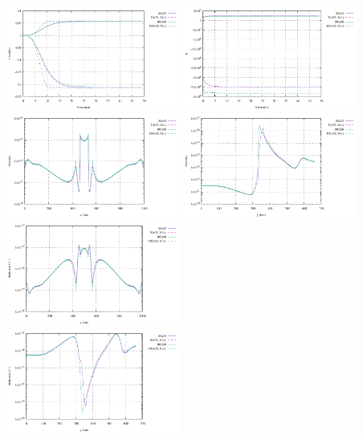 \begin{center}
\includegraphics[width=5.7cm]{python_codes/fieldstone_87/results/experiment_04/v}
\includegraphics[width=5.7cm]{python_codes/fieldstone_87/results/experiment_04/p}\\
\includegraphics[width=5.7cm]{python_codes/fieldstone_87/results/experiment_04/horizontal_profile_eta.pdf}
\includegraphics[width=5.7cm]{python_codes/fieldstone_87/results/experiment_04/vertical_profile_eta.pdf}
\includegraphics[width=5.7cm]{python_codes/fieldstone_87/results/experiment_04/horizontal_profile_srn.pdf}\\
\includegraphics[width=5.7cm]{python_codes/fieldstone_87/results/experiment_04/vertical_profile_srn.pdf}

\end{center}
